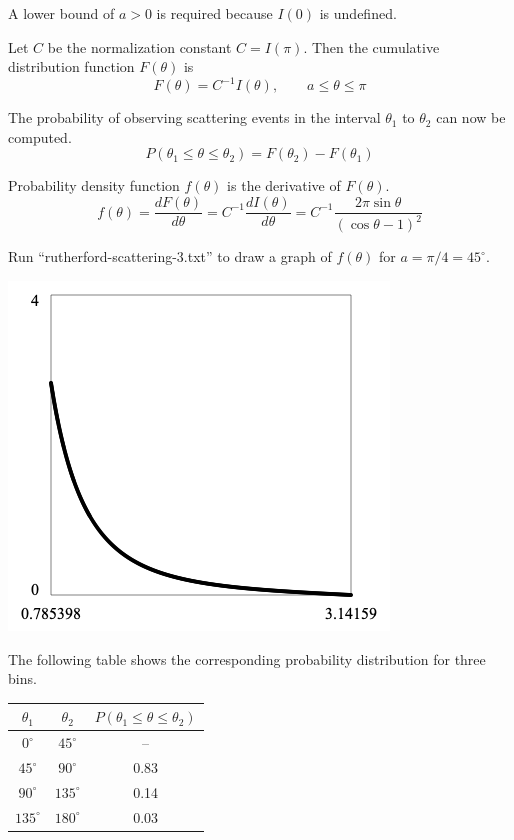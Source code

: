 \documentclass[12pt]{article}
\begin{document}
\noindent
A lower bound of $a>0$ is required because $I(0)$ is undefined.

\bigskip
\noindent
Let $C$ be the normalization constant $C=I(\pi)$.
Then the cumulative distribution function $F(\theta)$ is
\begin{equation*}
F(\theta)=C^{-1}I(\theta),
\qquad a\le\theta\le\pi
\end{equation*}

\noindent
The probability of observing scattering events
in the interval $\theta_1$ to $\theta_2$ can now be computed.
\begin{equation*}
P(\theta_1\le\theta\le\theta_2)=F(\theta_2)-F(\theta_1)
\end{equation*}

\noindent
Probability density function $f(\theta)$ is the derivative of $F(\theta)$.
\begin{equation*}
f(\theta)=\frac{dF(\theta)}{d\theta}=C^{-1}\frac{dI(\theta)}{d\theta}
=C^{-1}\frac{2\pi\sin\theta}{(\cos\theta-1)^2}
\end{equation*}

\noindent
Run ``rutherford-scattering-3.txt'' to draw a graph of $f(\theta)$ for $a=\pi/4=45^\circ$.

\begin{center}
\includegraphics[scale=0.5]{rutherford-scattering-1.png}
\end{center}

\noindent
The following table shows the corresponding probability distribution for three bins.

\begin{center}
\begin{tabular}{|c|c|c|}
\hline
$\theta_1$ & $\theta_2$ & $P(\theta_1\le\theta\le\theta_2)$\\
\hline
$0^\circ$ & $45^\circ$ & -- \\
$45^\circ$ & $90^\circ$ & 0.83 \\
$90^\circ$ & $135^\circ$ & 0.14 \\
$135^\circ$ & $180^\circ$ & 0.03 \\
\hline
\end{tabular}
\end{center}
\end{document}
